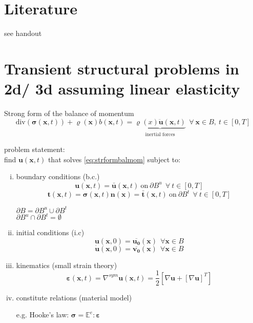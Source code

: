 \documentclass[10pt,a4paper]{article}
\begin{document}
\section{Literature}

see handout

\section{Transient structural problems in 2d/ 3d assuming linear elasticity}

Strong form of the balance of momentum
\begin{equation}
\text{div} ( \bm\sigma (\bm x , t)) + \varrho (\bm x) b (\bm x, t)
= \underbrace{\varrho (x) \bm{\ddot{u}} (\bm x, t)}_{\substack{\text{inertial forces}}}
~~\forall~\bm x  \in B,~t \in [0,T]
\label{eq:strformbalmom}
\end{equation}


problem statement: \\
find $\bm u (\bm{x}, t)$ that solves \eqref{eq:strformbalmom} subject to:

\begin{enumerate}[i)]
\item boundary conditions (b.c.)
\begin{equation}
\tag{Dirichlet}
\bm u (\bm{x}, t) = \bm{\bar{u}} (\bm{x}, t) ~\text{on}~ \partial B^u~~\forall~t \in [0, T]
\end{equation}
\begin{equation}
\tag{Neumann}
\bm{t} (\bm{x}, t) = \bm{\sigma} (\bm{x}, t) \bm{n} (\bm{x}) = \bm{\bar{t}} (\bm{x}, t) ~\text{on}~ \partial B^t ~~\forall~t \in [0, T]
\end{equation}

$\partial B = \partial B^u \cup \partial B^t$ \\
$\partial B^u \cap \partial B^t = \emptyset$
\item initial conditions (i.c)
\[ \bm{u} (\bm{x}, 0) = \bm{\overline{u_0}} (\bm{x}) ~~\forall \bm{x} \in B \]
\[ \bm{\dot{u}} (\bm{x}, 0) = \bm{\overline{v_0}} (\bm{x}) ~~\forall \bm{x} \in B \]
\item kinematics (small strain theory)
\[ \pmb\varepsilon (\bm{x}, t) = \nabla^{sym} \bm{u} (\bm{x}, t) = \frac{1}{2} \left[ \nabla \bm{u} + [\nabla \bm{u}]^T \right] \]
\item constitute relations (material model)

e.g. Hooke's law: $\bm{\sigma} = \pmb{\mathbb{E}}^e : \pmb\varepsilon$
\end{enumerate}
\end{document}
